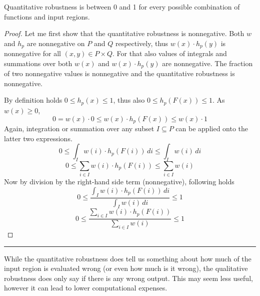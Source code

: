 \begin{lemma}{Quantitative robustness is between 0 and 1 for every possible combination
    of functions and input regions.}
    \begin{proof}
        Let me first show that the quantitative robustness is nonnegative.
        Both $w$ and $h_p$ are nonnegative on $P$ and $Q$ respectively,
        thus $w(x)\cdot h_p(y)$ is nonnegative for all $(x, y)\in P\times Q$.
        For that also values of integrals and summations over both $w(x)$
        and $w(x)\cdot h_p(y)$ are nonnegative.
        The fraction of two nonnegative values is nonnegative
        and the quantitative robustness is nonnegative.

        By definition holds $0 \leq h_p(x) \leq 1$, thus also $0 \leq h_p(F(x)) \leq 1$.
        As $w(x) \geq 0$, 
        \begin{equation*}
            0 = w(x) \cdot 0 \leq w(x) \cdot h_p(F(x)) \leq w(x)\cdot 1
        \end{equation*}
        Again, integration or summation over any subset $I \subseteq P$
        can be applied onto the latter two expressions.
        \begin{equation*}
            0 \leq \int_{I} w(i) \cdot h_p(F(i))\, di \leq \int_{I} w(i)\, di
        \end{equation*}
        \begin{equation*}
            0 \leq \sum_{i\in I} w(i) \cdot h_p(F(i)) \leq \sum_{i\in I} w(i)
        \end{equation*}
        Now by division by the right-hand side term (nonnegative), following holds
        \begin{equation*}
            0 \leq \frac{\int_{I} w(i) \cdot h_p(F(i))\, di}{\int_{I} w(i)\, di} \leq 1
        \end{equation*}
        \begin{equation*}
            0 \leq \frac{\sum_{i\in I} w(i) \cdot h_p(F(i))}{\sum_{i\in I} w(i)} \leq 1
        \end{equation*}
    \end{proof}
\end{lemma}

\hrule{}\vspace{1em}

While the quantitative robustness does tell us something about how much
of the input region is evaluated wrong (or even how much is it wrong),
the qualitative robustness does only say if there is any wrong output.
This may seem less useful, however it can lead to lower computational expenses.


